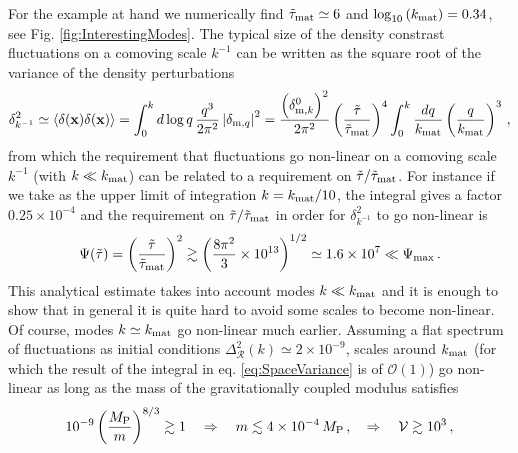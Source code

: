 \documentclass[11pt,a4paper]{article}
\newcommand{\V}{\mathcal{V}}
\begin{document}
For the example at hand we numerically find $\tilde\tau_{\rm mat} \simeq 6$ and $\log_{10} \left(k_{\rm mat}\right) = 0.34$, see Fig. \ref{fig:InterestingModes}. The typical size of the density constrast fluctuations on a comoving scale $k^{-1}$ can be written as the square root of the variance of the density perturbations
\begin{equation}
\label{eq:SpaceVariance}
\delta_{k^{-1}}^2 \simeq \langle \delta(\mathbf{x}) \delta(\mathbf{x}) \rangle = \int_0^k d \log q \, \frac{q^3}{2 \pi^2} \left|\delta_{\text{m},q}\right|^2 = \frac{\left(\delta_{\text{m},k}^0\right)^2}{2 \pi^2} \left(\frac{\tilde\tau}{\tilde\tau_{\rm mat}}\right)^4 \int_0^k \frac{dq}{k_{\rm mat}} \left(\frac{q}{k_{\rm mat}}\right)^3\,,
\end{equation}
from which the requirement that fluctuations go non-linear on a comoving scale $k^{-1}$ (with $k \ll k_{\rm mat}$) can be related to a requirement on $\tilde\tau/\tilde\tau_{\rm mat}$. For instance if we take as the upper limit of integration $k = k_{\rm mat}/10$, the integral gives a factor $0.25 \times 10^{-4}$ and the requirement on $\tilde\tau/\tilde\tau_{\rm mat}$ in order for $\delta^2_{k^{-1}}$ to go non-linear is
\begin{equation}
\Psi(\tilde\tau) = \left(\frac{\tilde\tau}{\tilde\tau_{\rm mat}}\right)^2 \gtrsim \left(\frac{8 \pi^2}{3} \times 10^{13}\right)^{1/2} \simeq 1.6 \times 10^7 \ll \Psi_{\rm max} \,.
\end{equation}
This analytical estimate takes into account modes $k \ll k_{\rm mat}$ and it is enough to show that in general it is quite hard to avoid some scales to become non-linear. Of course, modes $k \simeq k_{\rm mat}$ go non-linear much earlier. Assuming a flat spectrum of fluctuations as initial conditions $\Delta_{\mathcal{R}}^2(k) \simeq 2 \times 10^{-9}$, scales around $k_{\rm mat}$ (for which the result of the integral in eq. \eqref{eq:SpaceVariance} is of $\mathcal{O}\left(1\right)$) go non-linear as long as the mass of the gravitationally coupled modulus satisfies
\begin{equation}
\label{eq:EnhConstraint}
10^{-9} \left(\frac{M_{\rm P}}{m}\right)^{8/3} \gtrsim 1 \quad \Rightarrow \quad m \lesssim 4 \times 10^{-4} \, M_{\rm P} \,, \quad \Rightarrow \quad \V \gtrsim 10^3 \,,
\end{equation}
\end{document}
